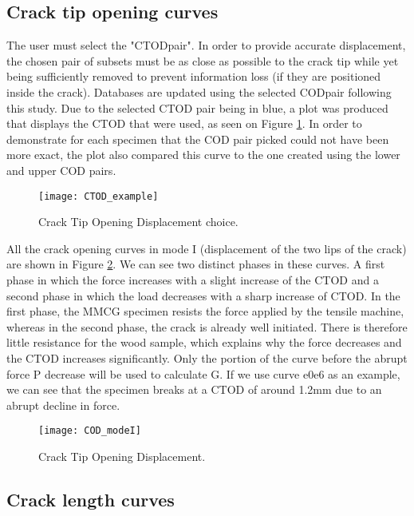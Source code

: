 \subsection{Crack tip opening curves}

The user must select the "CTODpair". In order to provide accurate displacement, the chosen pair of subsets must be as close as possible to the crack tip while yet being sufficiently removed to prevent information loss (if they are positioned inside the crack). Databases are updated using the selected CODpair following this study. Due to the selected CTOD pair being in blue, a plot was produced that displays the CTOD that were used, as seen on Figure \ref{fig:CTOD_example}. In order to demonstrate for each specimen that the COD pair picked could not have been more exact, the plot also compared this curve to the one created using the lower and upper COD pairs.

\begin{figure}[htp]
	\centering
	\texttt{[image: CTOD\_example]}
	\caption{Crack Tip Opening Displacement choice.}
	\label{fig:CTOD_example}
\end{figure}

All the crack opening curves in mode I (displacement of the two lips of the crack) are shown in Figure \ref{fig:COD_modeI}.
We can see two distinct phases in these curves. A first phase in which the force increases with a slight increase of the CTOD and a second phase in which the load decreases with a sharp increase of CTOD. In the first phase, the MMCG specimen resists the force applied by the tensile machine, whereas in the second phase, the crack is already well initiated. There is therefore little resistance for the wood sample, which explains why the force decreases and the CTOD increases significantly.
Only the portion of the curve before the abrupt force P decrease will be used to calculate G. If we use curve e0e6 as an example, we can see that the specimen breaks at a CTOD of around 1.2mm due to an abrupt decline in force.

\begin{figure}[htp]
	\centering
	\texttt{[image: COD\_modeI]}
	\caption{Crack Tip Opening Displacement.}
	\label{fig:COD_modeI}
\end{figure}

\subsection{Crack length curves}

